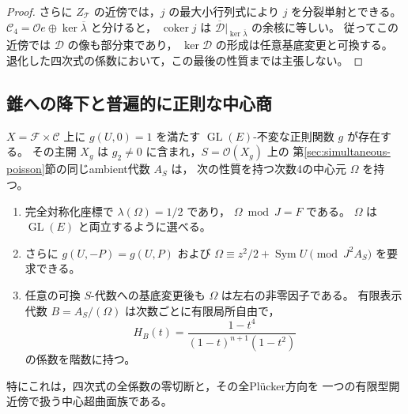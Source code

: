 \begin{proof}
さらに $Z_{\mathcal T}$ の近傍では，$j$ の最大小行列式により
$j$ を分裂単射とできる。
$\mathcal C_4=\mathcal O e\oplus\ker\overline\lambda$ と分けると，
$\operatorname{coker}j$ は
$\overline{\mathcal D}|_{\ker\overline\lambda}$ の余核に等しい。
従ってこの近傍では $\mathcal D$ の像も部分束であり，
$\ker\mathcal D$ の形成は任意基底変更と可換する。
退化した四次式の係数において，この最後の性質までは主張しない。
\end{proof}

\subsection{錐への降下と普遍的に正則な中心商}

\begin{theorem}[次数2の全方向の有限型中心商]
\label{thm:simultaneous-degree-two-central-family}
$X=\mathcal F\times\mathcal C$ 上に
$g(U,0)=1$ を満たす $\operatorname{GL}(E)$-不変な正則関数 $g$ が存在する。
その主開 $X_g$ は $g_2\ne0$ に含まれ，$S=\mathcal O(X_g)$ 上の
第\ref{sec:simultaneous-poisson}節の同じambient代数 $A_S$ は，
次の性質を持つ次数4の中心元 $\Omega$ を持つ。
\begin{enumerate}
\item 完全対称化座標で $\lambda(\Omega)=1/2$ であり，
      $\Omega\bmod J=F$ である。
      $\Omega$ は $\operatorname{GL}(E)$ と両立するように選べる。
\item さらに $g(U,-P)=g(U,P)$ および
      $\Omega\equiv z^2/2+\operatorname{Sym}U\pmod{J^2A_S}$ を要求できる。
\item 任意の可換 $S$-代数への基底変更後も $\Omega$ は左右の非零因子である。
      有限表示代数 $B=A_S/(\Omega)$ は次数ごとに有限局所自由で，
\[
 H_B(t)=\frac{1-t^4}{(1-t)^{n+1}(1-t^2)}
\]
      の係数を階数に持つ。
\end{enumerate}
特にこれは，四次式の全係数の零切断と，その全Pl\"ucker方向を
一つの有限型開近傍で扱う中心超曲面族である。
\end{theorem}
